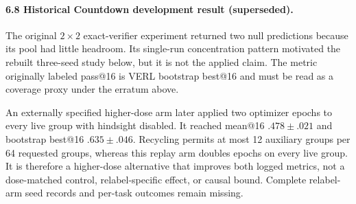 \paragraph{6.8 Historical Countdown development result (superseded).}
The original $2{\times}2$ exact-verifier experiment returned two null
predictions because its pool had little headroom. Its single-run concentration
pattern motivated the rebuilt three-seed study below, but it is not the applied
claim. The metric originally labeled pass@16 is VERL bootstrap best@16 and must
be read as a coverage proxy under the erratum above.

An externally specified higher-dose arm later applied two optimizer epochs to
every live group with hindsight disabled. It reached mean@16
$.478{\pm}.021$ and bootstrap best@16 $.635{\pm}.046$. Recycling permits at
most 12 auxiliary groups per 64 requested groups, whereas this replay arm
doubles epochs on every live group. It is therefore a higher-dose alternative
that improves both logged metrics, not a dose-matched control, relabel-specific
effect, or causal bound. Complete relabel-arm seed records and per-task outcomes
remain missing.

